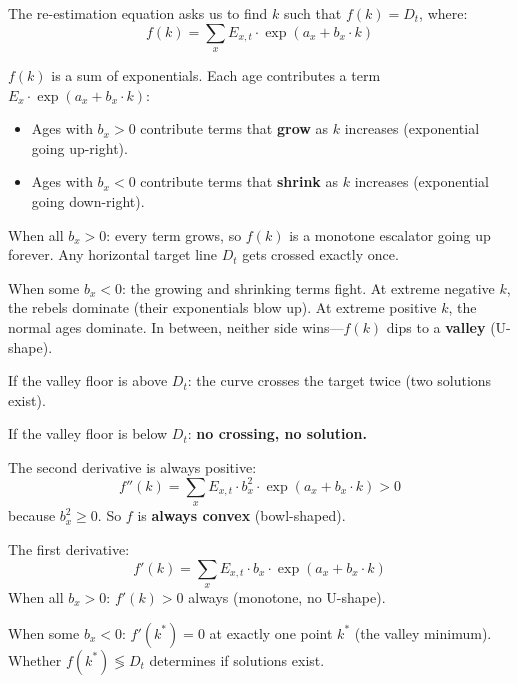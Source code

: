 \documentclass[11pt, a4paper]{article}
\newcommand{\ax}{a_x}
\newcommand{\bx}{b_x}
\begin{document}
The re-estimation equation asks us to find $k$ such that $f(k) = D_t$,
where:
\[
f(k) = \sum_x E_{x,t} \cdot \exp(\ax + \bx \cdot k)
\]

\begin{intuition}
$f(k)$ is a sum of exponentials. Each age contributes a term
$E_x \cdot \exp(\ax + \bx \cdot k)$:

\begin{itemize}[nosep]
\item Ages with $\bx > 0$ contribute terms that \textbf{grow} as $k$ increases
  (exponential going up-right).
\item Ages with $\bx < 0$ contribute terms that \textbf{shrink} as $k$ increases
  (exponential going down-right).
\end{itemize}

When all $\bx > 0$: every term grows, so $f(k)$ is a monotone escalator
going up forever. Any horizontal target line $D_t$ gets crossed exactly once.

When some $\bx < 0$: the growing and shrinking terms fight.
At extreme negative $k$, the rebels dominate (their exponentials blow up).
At extreme positive $k$, the normal ages dominate.
In between, neither side wins---$f(k)$ dips to a \textbf{valley} (U-shape).

\medskip
If the valley floor is above $D_t$: the curve crosses the target twice
(two solutions exist).

If the valley floor is below $D_t$: \textbf{no crossing, no solution.}
\end{intuition}

\begin{formaldef}
The second derivative is always positive:
\[
f''(k) = \sum_x E_{x,t} \cdot \bx^2 \cdot \exp(\ax + \bx \cdot k) > 0
\]
because $\bx^2 \geq 0$. So $f$ is \textbf{always convex} (bowl-shaped).

\medskip
The first derivative:
\[
f'(k) = \sum_x E_{x,t} \cdot \bx \cdot \exp(\ax + \bx \cdot k)
\]
When all $\bx > 0$: $f'(k) > 0$ always (monotone, no U-shape).

When some $\bx < 0$: $f'(k^*) = 0$ at exactly one point $k^*$
(the valley minimum). Whether $f(k^*) \lessgtr D_t$ determines
if solutions exist.
\end{formaldef}
\end{document}
